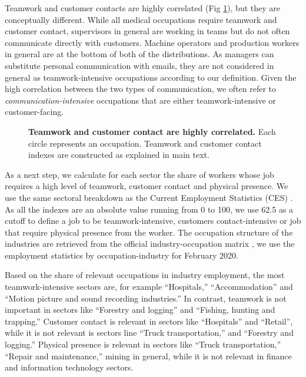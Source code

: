 Teamwork and customer contacts are highly correlated (Fig \ref{fig3}), but they are conceptually different. While all medical occupations require teamwork and customer contact, supervisors in general are working in teams but do not often communicate directly with customers. Machine operators and production workers in general are at the bottom of both of the distributions. As managers can substitute personal communication with emails, they are not considered in general as teamwork-intensive occupations according to our definition. Given the high correlation between the two types of communication, we often refer to \emph{communication-intensive} occupations that are either teamwork-intensive or customer-facing. 

\begin{figure}[!h]

\caption{{\bf Teamwork and customer contact are highly correlated.}
Each circle represents an occupation. Teamwork and customer contact indexes are constructed as explained in main text.}
\label{fig3}
\end{figure}

As a next step, we calculate for each sector the share of workers whose job requires a high level of teamwork, customer contact and physical presence. 
We use the same sectoral breakdown as the Current Employment Statistics (CES) \cite{CES}. As all the indexes are an absolute value running from 0 to 100, we use 62.5 as a cutoff to define a job to be teamwork-intensive, customers contact-intensive or job that require physical presence from the worker.  The occupation structure of the industries are retrieved from the official industry-occupation matrix \cite{employment-matrix}, we use the employment statistics by occupation-industry for February 2020. 

Based on the share of relevant occupations in industry employment, the most teamwork-intensive sectors are, for example ``Hospitals,'' ``Accommodation'' and  ``Motion picture and sound recording industries.'' In contrast, teamwork is not important in sectors like ``Forestry and logging'' and ``Fishing, hunting and trapping.''  Customer contact is relevant in sectors like ``Hospitals''  and ``Retail'', while it is not relevant is sectors line ``Truck transportation,'' and ``Forestry and logging.'' Physical presence is relevant in sectors like  ``Truck transportation,'' ``Repair and maintenance,'' mining in general, while it is not relevant in finance and information technology sectors. 

